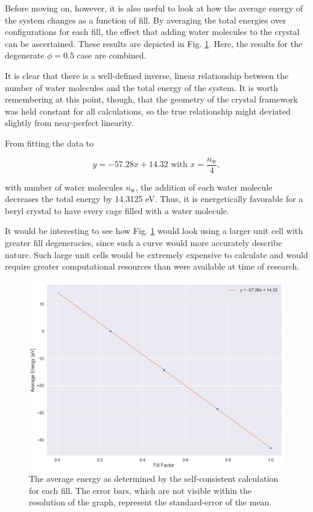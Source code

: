         Before moving on, however, it is also useful to look at how the average energy of the system changes as a function of fill. By averaging the total energies over configurations for each fill, the effect that adding water molecules to the crystal can be ascertained. These results are depicted in Fig. \ref{fig:pmap_avg_energy}. Here, the results for the degenerate $\phi = 0.5$ case are combined.
        
        It is clear that there is a well-defined inverse, linear relationship between the number of water molecules and the total energy of the system. It is worth remembering at this point, though, that the geometry of the crystal framework was held constant for all calculations, so the true relationship might deviated slightly from near-perfect linearity. 
        
        From fitting the data to 
        
        \begin{equation}
            y = -57.28x+14.32 \text{ with } x = \frac{n_\text{w}}{4},
        \end{equation}
        
        \noindent with number of water molecules $n_\text{w}$, the addition of each water molecule decreases the total energy by 14.3125 eV. Thus, it is energetically favorable for a beryl crystal to have every cage filled with a water molecule.
        
        It would be interesting to see how Fig. \ref{fig:pmap_avg_energy} would look using a larger unit cell with greater fill degeneracies, since such a curve would more accurately describe nature. Such large unit cells would be extremely expensive to calculate and would require greater computational resources than were available at time of research.
        
        \begin{figure}
            \centering
            \includegraphics[width=0.9\linewidth]{Figures/System/pmap_broad_avg_energy.png}
            \caption{The average energy as determined by the self-consistent calculation for each fill. The error bars, which are not visible within the resolution of the graph, represent the standard-error of the mean.}
            \label{fig:pmap_avg_energy}
        \end{figure}
        

